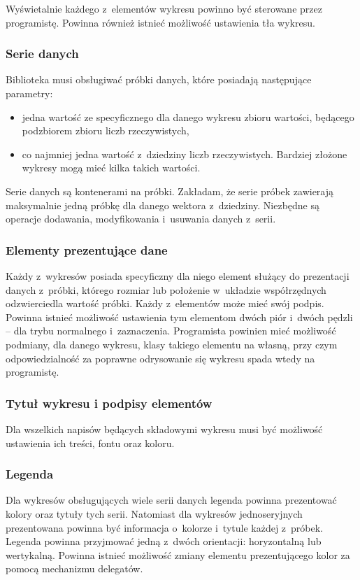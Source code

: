 Wyświetalnie każdego z~elementów wykresu powinno być sterowane przez programistę. Powinna również istnieć możliwość ustawienia tła wykresu.

\subsubsection{Serie danych}
Biblioteka musi obsługiwać próbki danych, które posiadają następujące parametry:
\begin{itemize}
\item{jedna wartość ze specyficznego dla danego wykresu zbioru wartości, będącego podzbiorem zbioru liczb rzeczywistych,}
\item{co najmniej jedna wartość z~dziedziny liczb rzeczywistych. Bardziej złożone wykresy mogą mieć kilka takich wartości.}
\end{itemize}

Serie danych są kontenerami na próbki. Zakładam, że serie próbek zawierają maksymalnie jedną próbkę dla danego wektora z~dziedziny. Niezbędne są operacje dodawania, modyfikowania i~usuwania danych z~serii.
 
\subsubsection{Elementy prezentujące dane}
Każdy z~wykresów posiada specyficzny dla niego element służący do prezentacji danych z~próbki, którego rozmiar lub położenie w~układzie współrzędnych odzwierciedla wartość próbki. Każdy z~elementów może mieć swój podpis. Powinna istnieć możliwość ustawienia tym elementom dwóch piór i~dwóch pędzli -- dla trybu normalnego i~zaznaczenia. Programista powinien mieć możliwość podmiany, dla danego wykresu, klasy takiego elementu na własną, przy czym odpowiedzialność za poprawne odrysowanie się wykresu spada wtedy na programistę.

\subsubsection{Tytuł wykresu i podpisy elementów}
Dla wszelkich napisów będących składowymi wykresu musi być możliwość ustawienia ich treści, fontu oraz koloru.

\subsubsection{Legenda}
Dla wykresów obsługujących wiele serii danych legenda powinna prezentować kolory oraz tytuły tych serii. Natomiast dla wykresów jednoseryjnych prezentowana powinna być informacja o~kolorze i~tytule każdej z~próbek. Legenda powinna przyjmować jedną z~dwóch orientacji: horyzontalną lub wertykalną. Powinna istnieć możliwość zmiany elementu prezentującego kolor za pomocą mechanizmu delegatów.

